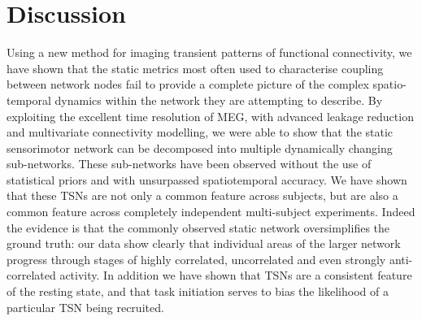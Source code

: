 \section{Discussion}
Using a new method for imaging transient patterns of functional connectivity, we have shown that the static metrics most often used to characterise coupling between network nodes fail to provide a complete picture of the complex spatio-temporal dynamics within the network they are attempting to describe. By exploiting the excellent time resolution of MEG, with advanced leakage reduction and multivariate connectivity modelling, we were able to show that the static sensorimotor network can be decomposed into multiple dynamically changing sub-networks. These sub-networks have been observed without the use of statistical priors and with unsurpassed spatiotemporal accuracy. We have shown that these TSNs are not only a common feature across subjects, but are also a common feature across completely independent multi-subject experiments. Indeed the evidence is that the commonly observed static network oversimplifies the ground truth: our data show clearly that individual areas of the larger network progress through stages of highly correlated, uncorrelated and even strongly anti-correlated activity. In addition we have shown that TSNs are a consistent feature of the resting state, and that task initiation serves to bias the likelihood of a particular TSN being recruited.

